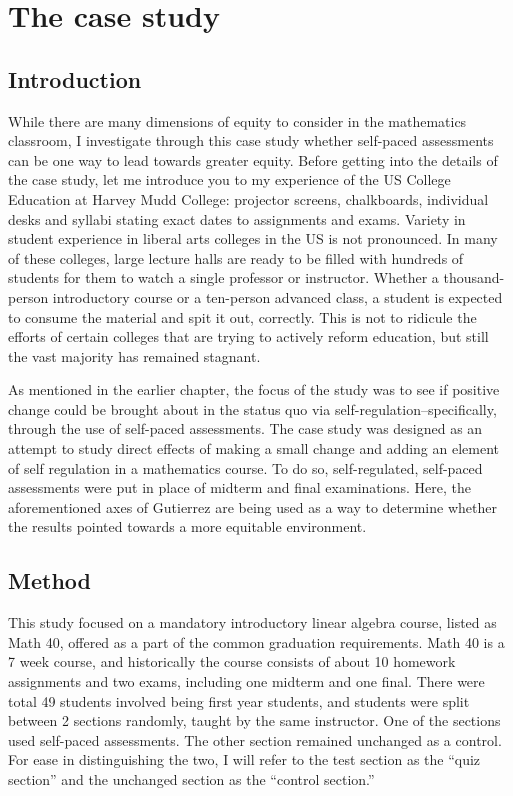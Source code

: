 \chapter{The case study}
\section{Introduction}

While there are many dimensions of equity to consider in the mathematics classroom, I investigate through this case study whether self-paced assessments can be one way to lead towards greater equity. Before getting into the details of the case study, let me introduce you to my experience of the US College Education at Harvey Mudd College: projector screens, chalkboards, individual desks and syllabi stating exact dates to assignments and exams. Variety in student experience in liberal arts colleges in the US is not pronounced. In many of these colleges, large lecture halls are ready to be filled with hundreds of students for them to watch a single professor or instructor. Whether a thousand-person introductory course or a ten-person advanced class, a student is expected to consume the material and spit it out, correctly. This is not to ridicule the efforts of certain colleges that are trying to actively reform education, but still the vast majority has remained stagnant.

As mentioned in the earlier chapter, the focus of the study was to see if positive change could be brought about in the status quo via self-regulation--specifically, through the use of self-paced assessments. The case study was designed as an attempt to study direct effects of making a small change and adding an element of self regulation in a mathematics course. To do so, self-regulated, self-paced assessments were put in place of midterm and final examinations. Here, the aforementioned axes of Gutierrez are being used as a way to determine whether the results pointed towards a more equitable environment.

\section{Method}
This study focused on a mandatory introductory linear algebra course, listed as Math 40, offered as a part of the common graduation requirements. Math 40 is a 7 week course, and historically the course consists of about 10 homework assignments and two exams, including one midterm and one final. There were total 49 students involved being first year students, and students were split between 2 sections randomly, taught by the same instructor. One of the sections used self-paced assessments. The other section remained unchanged as a control. For ease in distinguishing the two, I will refer to the test section as the ``quiz section'' and the unchanged section as the ``control section.''

